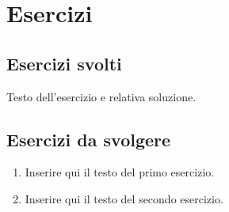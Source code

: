 \chapter{Esercizi}
\section{Esercizi svolti}
\begin{esempio}
Testo dell'esercizio e relativa soluzione.
\end{esempio}

\section{Esercizi da svolgere}
\begin{enumerate}
	\item Inserire qui il testo del primo esercizio.
	\item Inserire qui il testo del secondo esercizio.
\end{enumerate}
